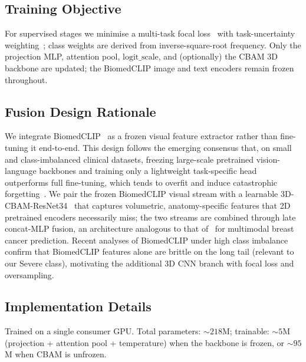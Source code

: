 \subsection{Training Objective}
For supervised stages we minimise a multi-task focal
loss~\cite{lin2017focal} with task-uncertainty
weighting~\cite{kendall2018uncertainty}; class weights are derived from
inverse-square-root frequency. Only the projection MLP, attention pool,
$\mathrm{logit\_scale}$, and (optionally) the CBAM 3D backbone are updated;
the BiomedCLIP image and text encoders remain frozen throughout.

\subsection{Fusion Design Rationale}
\label{sec:fusion-rationale}
We integrate BiomedCLIP~\cite{zhang2023biomedclip} as a frozen visual
feature extractor rather than fine-tuning it end-to-end. This design
follows the emerging consensus that, on small and class-imbalanced
clinical datasets, freezing large-scale pretrained vision-language
backbones and training only a lightweight task-specific head outperforms
full fine-tuning, which tends to overfit and induce catastrophic
forgetting~\cite{liu2024frozenvlmbreast,benchmarkfm2025,whyfmpathology2025}.
We pair the frozen BiomedCLIP visual stream with a learnable
3D-CBAM-ResNet34~\cite{woo2018cbam,he2016resnet} that captures volumetric,
anatomy-specific features that 2D pretrained encoders necessarily miss;
the two streams are combined through late concat-MLP fusion, an
architecture analogous to that of~\cite{liu2024frozenvlmbreast} for
multimodal breast cancer prediction. Recent analyses of BiomedCLIP under
high class imbalance~\cite{biomedclipImbalance2025} confirm that
BiomedCLIP features alone are brittle on the long tail (relevant to our
Severe class), motivating the additional 3D CNN branch with focal loss
and oversampling.

\subsection{Implementation Details}
Trained on a single consumer GPU. Total parameters: ${\sim}218$M;
trainable: ${\sim}5$M (projection + attention pool + temperature) when
the backbone is frozen, or ${\sim}95$M when CBAM is unfrozen.
